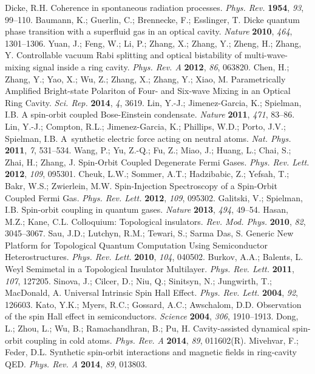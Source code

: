 \documentclass[atoms,article,accept,moreauthors,pdftex,12pt,a4paper]{mdpi}
\begin{document}
\begin{thebibliography}{----}

Dicke, R.H. Coherence in spontaneous radiation processes. {\em Phys. Rev.} {\bf 1954}, {\em 93}, 99--110.
Baumann, K.; Guerlin, C.; Brennecke, F.; Esslinger, T. Dicke quantum phase transition with a superfluid gas in an optical cavity. {\em Nature} {\bf 2010}, {\em 464}, 1301--1306.
 Yuan, J.; Feng, W.; Li, P.; Zhang, X.; Zhang, Y.; Zheng, H.; Zhang, Y. Controllable vacuum Rabi splitting and optical bistability of multi-wave-mixing signal inside a ring cavity. {\em Phys. Rev. A} {\bf 2012}, {\em 86}, 063820.
 Chen, H.; Zhang, Y.; Yao, X.; Wu, Z.; Zhang, X.; Zhang, Y.; Xiao, M. Parametrically Amplified Bright-state Polariton of Four- and Six-wave Mixing in an Optical Ring Cavity. {\em Sci. Rep.} {\bf 2014}, {\em 4}, 3619.
Lin, Y.-J.; Jimenez-Garcia, K.; Spielman, I.B. A spin-orbit coupled Bose-Einstein condensate. {\em Nature} {\bf 2011}, {\em 471}, 83--86.
Lin, Y.-J.; Compton, R.L.; Jimenez-Garcia, K.; Phillips, W.D.; Porto, J.V.; Spielman, I.B. A~synthetic electric force acting on neutral atoms. {\em Nat. Phys.} {\bf 2011}, {\em 7}, 531--534.
Wang, P.; Yu, Z.-Q.; Fu, Z.; Miao, J.; Huang, L.; Chai, S.; Zhai, H.; Zhang, J. Spin-Orbit Coupled Degenerate Fermi Gases. {\em Phys. Rev. Lett.} {\bf 2012}, {\em 109}, 095301.
Cheuk, L.W.; Sommer, A.T.; Hadzibabic, Z.; Yefsah, T.; Bakr, W.S.; Zwierlein, M.W. Spin-Injection Spectroscopy of a Spin-Orbit Coupled Fermi Gas. {\em Phys. Rev. Lett.} {\bf 2012}, {\em 109}, 095302.
Galitski, V.; Spielman, I.B. Spin-orbit coupling in quantum gases. {\em Nature} {\bf 2013}, {\em 494}, 49--54. 
Hasan, M.Z.; Kane, C.L. Colloquium: Topological insulators. {\em Rev. Mod. Phys.} {\bf 2010}, {\em 82}, 3045--3067.
Sau, J.D.; Lutchyn, R.M.; Tewari, S.; Sarma Das, S. Generic New Platform for Topological Quantum Computation Using Semiconductor Heterostructures. {\em Phys. Rev. Lett.} {\bf 2010}, {\em 104}, 040502.
Burkov, A.A.; Balents, L. Weyl Semimetal in a Topological Insulator Multilayer. {\em Phys. Rev. Lett.} {\bf 2011}, {\em 107}, 127205.
Sinova, J.; Cilcer, D.; Niu, Q.; Sinitsyn, N.; Jungwirth, T.; MacDonald, A. Universal Intrinsic Spin Hall Effect. {\em Phys. Rev. Lett.} {\bf 2004}, {\em 92}, 126603.
Kato, Y.K.; Myers, R.C.; Gossard, A.C.; Awschalom, D.D. Observation of the spin Hall effect in semiconductors. {\em Science} {\bf 2004}, {\em 306}, 1910--1913.
Dong, L.; Zhou, L.; Wu, B.; Ramachandhran, B.; Pu, H. Cavity-assisted dynamical spin-orbit coupling in cold atoms. {\em Phys. Rev. A} {\bf 2014}, {\em 89}, 011602(R).
Mivehvar, F.; Feder, D.L. Synthetic spin-orbit interactions and magnetic fields in ring-cavity QED. {\em Phys. Rev. A} {\bf 2014}, {\em 89}, 013803.


\end{thebibliography}
\end{document}
